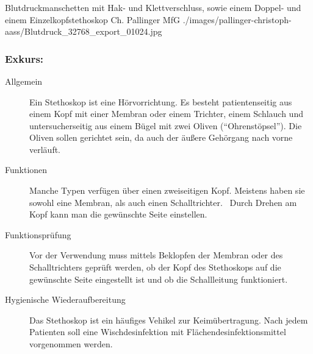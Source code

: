 \subsubsection{}
{}
{}
{}
{}



\PictureWide
{Blutdruckmanschetten mit Hak- und Klettverschluss, sowie
einem Doppel- und einem Einzelkopfstethoskop}%
{}%
{}%
{Ch. Pallinger}%
{MfG}%
{./images/pallinger-christoph-aass/Blutdruck_32768_export_01024.jpg}%
{}%
{}%

\subsubsection{Exkurs: }
\label{topic:stethoskop}

\Text{\TxBeschreibung}
{
\begin{description}
  \item[Allgemein] Ein Stethoskop ist eine Hörvorrichtung. Es besteht
patientenseitig aus einem Kopf mit einer Membran oder einem
Trichter, einem Schlauch und untersucherseitig aus einem
Bügel mit zwei Oliven (\enquote{Ohrenstöpsel}).
Die Oliven sollen  gerichtet sein, da auch der
äußere Gehörgang nach vorne verläuft.
\item[Funktionen] Manche Typen verfügen über einen
zweiseitigen Kopf.
Meistens haben sie sowohl eine Membran, als auch einen
Schalltrichter.~ Durch Drehen am Kopf kann man die gewünschte Seite
einstellen.
\item[Funktionsprüfung] Vor der Verwendung muss mittels Beklopfen der Membran oder
des Schalltrichters geprüft werden, ob der Kopf des
Stethoskops auf die gewünschte Seite eingestellt ist und ob
die Schallleitung funktioniert.
\item[Hygienische Wiederaufbereitung] Das Stethoskop ist ein
häufiges Vehikel zur Keimübertragung. Nach jedem Patienten soll eine 
Wischdesinfektion mit Flächendesinfektionsmittel
vorgenommen werden.
\end{description}

}{}{}{}{}



